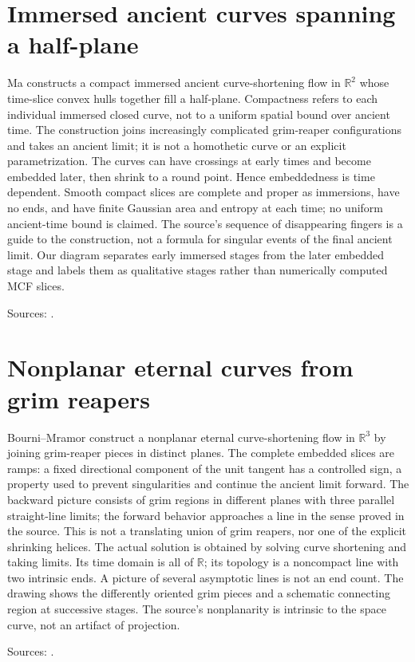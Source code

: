\chapter{Immersed ancient curves spanning a half-plane}\label{sec:catalogue-ma-halfplane-ancient}
\begin{example}\label{ex:catalogue-ma-halfplane-ancient}
Ma constructs a compact immersed ancient curve-shortening flow in $\mathbb R^2$ whose time-slice convex hulls together fill a half-plane. Compactness refers to each individual immersed closed curve, not to a uniform spatial bound over ancient time. The construction joins increasingly complicated grim-reaper configurations and takes an ancient limit; it is not a homothetic curve or an explicit parametrization.
The curves can have crossings at early times and become embedded later, then shrink to a round point. Hence embeddedness is time dependent. Smooth compact slices are complete and proper as immersions, have no ends, and have finite Gaussian area and entropy at each time; no uniform ancient-time bound is claimed. The source's sequence of disappearing fingers is a guide to the construction, not a formula for singular events of the final ancient limit. Our diagram separates early immersed stages from the later embedded stage and labels them as qualitative stages rather than numerically computed MCF slices.
\par Sources: \cite{CatMa2021}.
\end{example}

\chapter{Nonplanar eternal curves from grim reapers}\label{sec:catalogue-nonplanar-eternal-reapers}
\begin{example}\label{ex:catalogue-nonplanar-eternal-reapers}
Bourni--Mramor construct a nonplanar eternal curve-shortening flow in $\mathbb R^3$ by joining grim-reaper pieces in distinct planes. The complete embedded slices are ramps: a fixed directional component of the unit tangent has a controlled sign, a property used to prevent singularities and continue the ancient limit forward. The backward picture consists of grim regions in different planes with three parallel straight-line limits; the forward behavior approaches a line in the sense proved in the source.
This is not a translating union of grim reapers, nor one of the explicit shrinking helices. The actual solution is obtained by solving curve shortening and taking limits. Its time domain is all of $\mathbb R$; its topology is a noncompact line with two intrinsic ends. A picture of several asymptotic lines is not an end count. The drawing shows the differently oriented grim pieces and a schematic connecting region at successive stages. The source's nonplanarity is intrinsic to the space curve, not an artifact of projection.
\par Sources: \cite{CatBourniMramor2023}.
\end{example}

